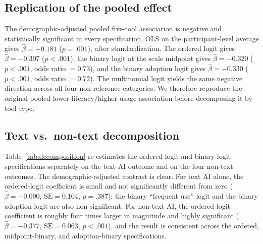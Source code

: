 \documentclass[11pt]{article}
\begin{document}
\subsection{Replication of the pooled effect}

The demographic-adjusted pooled five-tool association is negative and
statistically significant in every specification. OLS on the participant-level
average gives $\hat\beta = -0.181$ ($p = .001$), after standardization. The
ordered logit gives $\hat\beta = -0.307$ ($p < .001$), the binary logit at the
scale midpoint gives $\hat\beta = -0.320$ ($p < .001$, odds ratio $=0.73$), and
the binary adoption logit gives $\hat\beta = -0.330$ ($p < .001$, odds ratio
$=0.72$). The multinomial logit yields the same negative direction across all
four non-reference categories. We therefore reproduce the original pooled
lower-literacy/higher-usage association before decomposing it by tool type.

\subsection{Text vs.\ non-text decomposition}

Table~\ref{tab:decomposition} re-estimates the ordered-logit and binary-logit
specifications separately on the text-AI outcome and on the four non-text
outcomes. The demographic-adjusted contrast is clear. For text AI alone, the
ordered-logit coefficient is small and not significantly different from zero
($\hat\beta = -0.090$, $\mathrm{SE} = 0.104$, $p = .387$); the binary
``frequent use'' logit and the binary adoption logit are also non-significant.
For non-text AI, the ordered-logit coefficient is roughly four times larger in
magnitude and highly significant ($\hat\beta = -0.377$,
$\mathrm{SE} = 0.063$, $p < .001$), and the result is consistent across the
ordered, midpoint-binary, and adoption-binary specifications.
\end{document}
